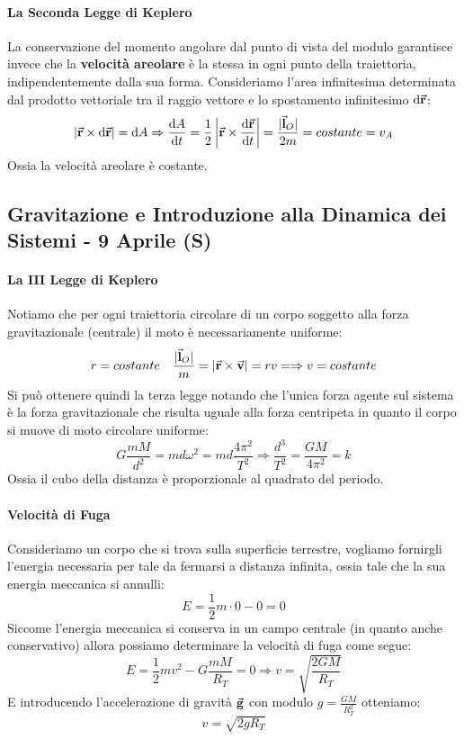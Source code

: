 \documentclass{article}
\newcommand{\then}{\ensuremath{\Rightarrow}}
\renewcommand{\v}{\va{v}}
\renewcommand{\r}{\va{r}}
\newcommand{\g}{\va{g}}
\renewcommand{\l}{\va{l}}
\begin{document}
\paragraph{La Seconda Legge di Keplero}
La conservazione del momento angolare dal punto di vista del modulo garantisce invece che la \textbf{velocità areolare} è la stessa in ogni punto della traiettoria, indipendentemente dalla sua forma. Consideriamo l'area infinitesima determinata dal prodotto vettoriale tra il raggio vettore e lo spostamento infinitesimo $\dd\r$:
\begin{equation}
|\r\times\dd\r|=\dd A\then \dv{A}{t}=\frac{1}{2}\left|\r\times\dv{\r}{t}\right|=\frac{|\l_O|}{2m}=costante=v_A
\end{equation}
Ossia la velocità areolare è costante.
\subsection{Gravitazione e Introduzione alla Dinamica dei Sistemi - 9 Aprile (S)}
\paragraph{La III Legge di Keplero}
Notiamo che per ogni traiettoria circolare di un corpo soggetto alla forza gravitazionale (centrale) il moto è necessariamente uniforme:
\[r=costante\quad \frac{|\l_O|}{m}=|\r\times\v|=rv=\then v=costante\]
Si può ottenere quindi la terza legge notando che l'unica forza agente sul sistema è la forza gravitazionale che risulta uguale alla forza centripeta in quanto il corpo si muove di moto circolare uniforme:
\[G\frac{mM}{d^2}=md\omega^2=md\frac{4\pi^2}{T^2}\then \frac{d^3}{T^2}=\frac{GM}{4\pi^2}=k \]
Ossia il cubo della distanza è proporzionale al quadrato del periodo.
\paragraph{Velocità di Fuga}
Consideriamo un corpo che si trova sulla superficie terrestre, vogliamo fornirgli l'energia necessaria per tale da fermarsi a distanza infinita, ossia tale che la sua energia meccanica si annulli:
\[E=\frac{1}{2}m\cdot0-0=0\]
Siccome l'energia meccanica si conserva in un campo centrale (in quanto anche conservativo) allora possiamo determinare la velocità di fuga come segue:
\begin{equation}
    E=\frac{1}{2}mv^2-G\frac{mM}{R_T}=0\then \boxed{v=\sqrt{\frac{2GM}{R_T}}}
\end{equation}
E introducendo l'accelerazione di gravità $\g$ con modulo $g=\frac{GM}{R_T^2}$ otteniamo:
\begin{equation}
    \boxed{v=\sqrt{2gR_T}}
\end{equation}
\end{document}
